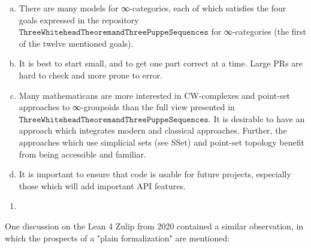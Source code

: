 \documentclass{book}
\begin{document}
\begin{enumerate}[(a)]
    \item There are many models for ∞-categories, each of which satisfies the four goals expressed in the repository $\texttt{ThreeWhiteheadTheoremandThreePuppeSequences}$ for ∞-categories (the first of the twelve mentioned goals). 
    \item It is best to start small, and to get one part correct at a time. Large PRs are hard to check and more prone to error.
    \item Many mathematicans are more interested in CW-complexes and point-set approaches to ∞-groupoids than the full view presented in $\texttt{ThreeWhiteheadTheoremandThreePuppeSequences}$. It is desirable to have an approach which integrates modern and classical approaches. Further, the approaches which use simplicial sets (see SSet) and point-set topology benefit from being accessible and familiar.
    \item It is important to ensure that code is usable for future projects, especially those which will add important API features.
    \end{enumerate}



\begin{enumerate}
\item 
\end{enumerate}


One discussion on the Lean 4 Zulip from 2020 contained a similar observation, in which the prospects of a "plain formalization" are mentioned:
\end{document}
